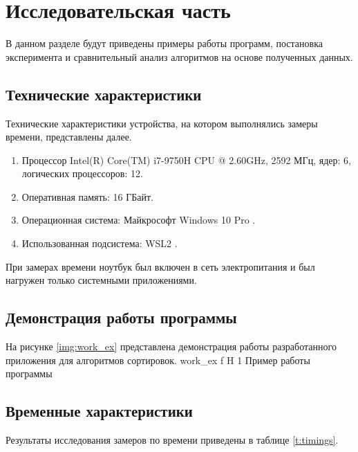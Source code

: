 \chapter{Исследовательская часть}

В данном разделе будут приведены примеры работы программ, постановка эксперимента и сравнительный анализ алгоритмов на основе полученных данных.


\section{Технические характеристики}

Технические характеристики устройства, на котором выполнялись замеры времени, представлены далее.

\begin{enumerate}
	\item Процессор	Intel(R) Core(TM) i7-9750H CPU @ 2.60GHz, 2592 МГц, ядер: 6, логических процессоров: 12.
	\item Оперативная память: 16 ГБайт.
	\item Операционная система: Майкрософт Windows 10 Pro \cite{windows}.
	\item Использованная подсистема: WSL2 \cite{WSL2}.
\end{enumerate}

При замерах времени ноутбук был включен в сеть электропитания и был нагружен только системными приложениями.



\section{Демонстрация работы программы}

На рисунке \ref{img:work_ex} представлена демонстрация работы разработанного приложения для алгоритмов сортировок.
{work_ex} %
{f} %
{H} %
{1\textwidth} %
{Пример работы программы} %



\section{Временные характеристики}

Результаты исследования замеров по времени приведены в таблице \ref{t:timings}.

